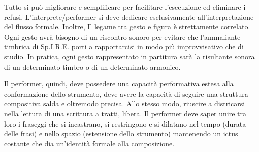 Tutto si può migliorare e semplificare per facilitare l'esecuzione ed eliminare i refusi. L'interprete/performer si deve dedicare esclusivamente all'interpretazione del flusso formale. Inoltre, Il legame tra gesto e figura è strettamente correlato. Ogni gesto avrà bisogno di un riscontro sonoro per evitare che l'ammaliante timbrica di Sp.I.R.E. porti a rapportarcisi in modo più improvvisativo che di studio. In pratica, ogni gesto rappresentato in partitura sarà la risultante sonora di un determinato timbro o di un determinato armonico.

Il performer, quindi, deve possedere una capacità performativa estesa alla conformazione dello strumento,  deve avere la capacità di seguire una struttura compositiva salda e oltremodo precisa. Allo stesso modo, riuscire a districarsi nella lettura di una scrittura a tratti, libera. Il performer deve saper unire tra loro i fraseggi che si incastrano, si restringono e si dilatano nel tempo (durata delle frasi) e nello spazio (estensione dello strumento) mantenendo un ictus costante che dia un'identità formale alla composizione.
